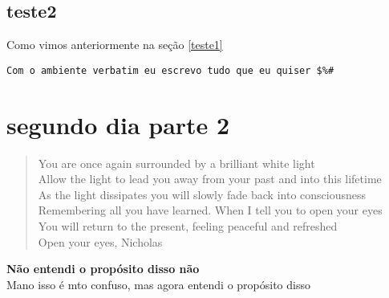 \documentclass[a4paper,11pt]{report}
\newenvironment{eoq}{\begin{flushright}{\bfseries Não entendi o propósito disso não \\}}{\end{flushright}}
\begin{document}
\section{teste2}

Como vimos anteriormente na seção \ref{teste1} \\
\begin{verbatim}
Com o ambiente verbatim eu escrevo tudo que eu quiser $%#
\end{verbatim} %

\chapter {segundo dia parte 2}

\begin{verse}
{\small
You are once again surrounded by a brilliant white light\\
Allow the light to lead you away from your past and into this lifetime\\
As the light dissipates you will slowly fade back into consciousness\\
Remembering all you have learned. When I tell you to open your eyes\\
You will return to the present, feeling peaceful and refreshed\\

Open your eyes, Nicholas
}
\end{verse}
\begin{eoq}
Mano isso é mto confuso, mas agora entendi o propósito disso
\end{eoq}
\end{document}
